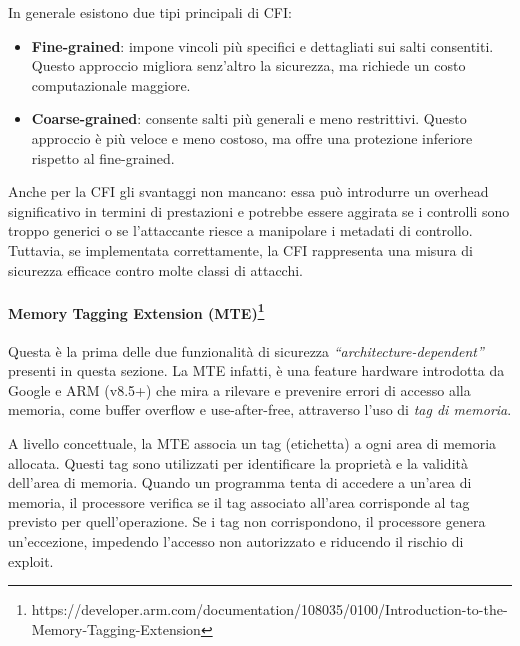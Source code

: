 In generale esistono due tipi principali di CFI:
\begin{itemize}
  \item \textbf{Fine-grained}: impone vincoli più specifici e dettagliati sui salti
    consentiti. Questo approccio migliora senz'altro la sicurezza, ma richiede un
    costo computazionale maggiore.

  \item \textbf{Coarse-grained}: consente salti più generali e meno restrittivi.
    Questo approccio è più veloce e meno costoso, ma offre una protezione inferiore
    rispetto al fine-grained.
\end{itemize}

Anche per la CFI gli svantaggi non mancano: essa può introdurre un overhead
significativo in termini di prestazioni e potrebbe essere aggirata se i
controlli sono troppo generici o se l'attaccante riesce a manipolare i metadati
di controllo. Tuttavia, se implementata correttamente, la CFI rappresenta una misura
di sicurezza efficace contro molte classi di attacchi.\cite{control_flow_integrity}

\paragraph{Memory Tagging Extension (MTE)\protect\footnote{https://developer.arm.com/documentation/108035/0100/Introduction-to-the-Memory-Tagging-Extension}}
Questa è la prima delle due funzionalità di sicurezza \textit{``architecture-dependent''}
presenti in questa sezione. La MTE infatti, è una feature hardware introdotta da
Google e ARM (v8.5+) che mira a rilevare e prevenire errori di accesso alla
memoria, come buffer overflow e use-after-free, attraverso l'uso di \textit{tag
di memoria}.

A livello concettuale, la MTE associa un tag (etichetta) a ogni area di memoria
allocata. Questi tag sono utilizzati per identificare la proprietà e la validità
dell'area di memoria. Quando un programma tenta di accedere a un'area di memoria,
il processore verifica se il tag associato all'area corrisponde al tag previsto per
quell'operazione. Se i tag non corrispondono, il processore genera un'eccezione,
impedendo l'accesso non autorizzato e riducendo il rischio di exploit.

